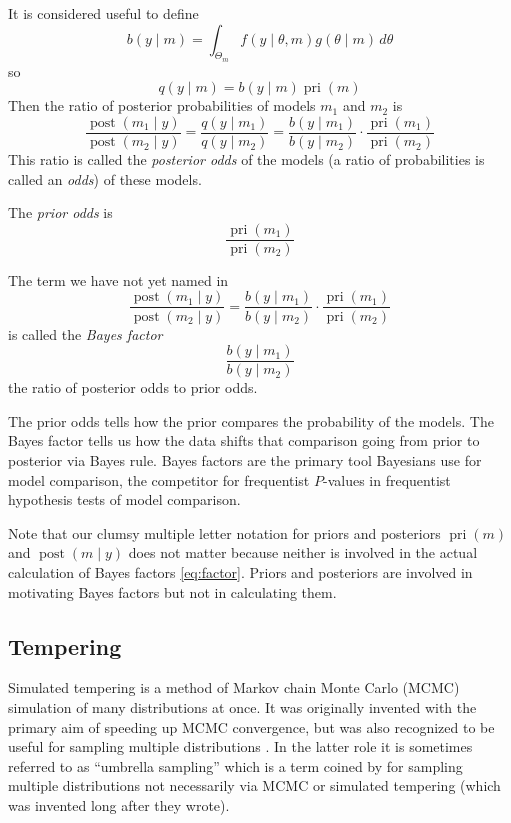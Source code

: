 \documentclass[11pt]{article}
\DeclareMathOperator{\prior}{pri}
\DeclareMathOperator{\posterior}{post}
\begin{document}
It is considered useful to define
$$
   b(y \mid m)
   =
   \int_{\Theta_m} f(y \mid \theta, m) g(\theta \mid m) \, d \theta
$$
so
$$
   q(y \mid m) = b(y \mid m) \prior(m)
$$
Then the ratio of posterior probabilities of models $m_1$ and $m_2$ is
$$
   \frac{\posterior(m_1 \mid y)}{\posterior(m_2 \mid y)}
   =
   \frac{q(y \mid m_1)}{q(y \mid m_2)}
   =
   \frac{b(y \mid m_1)}{b(y \mid m_2)}
   \cdot
   \frac{\prior(m_1)}{\prior(m_2)}
$$
This ratio is called the \emph{posterior odds} of the models (a ratio of
probabilities is called an \emph{odds}) of these models.

The \emph{prior odds} is
$$
   \frac{\prior(m_1)}{\prior(m_2)}
$$

The term we have not yet named in
$$
   \frac{\posterior(m_1 \mid y)}{\posterior(m_2 \mid y)}
   =
   \frac{b(y \mid m_1)}{b(y \mid m_2)}
   \cdot
   \frac{\prior(m_1)}{\prior(m_2)}
$$
is called the \emph{Bayes factor}
\begin{equation} \label{eq:factor}
   \frac{b(y \mid m_1)}{b(y \mid m_2)}
\end{equation}
the ratio of posterior odds to prior odds.

The prior odds tells how the prior compares the probability of the models.
The Bayes factor tells us how the data shifts that comparison going from
prior to posterior via Bayes rule.
Bayes factors are the primary tool Bayesians use for model comparison,
the competitor for frequentist $P$-values in frequentist hypothesis
tests of model comparison.

Note that our clumsy multiple letter notation for priors and posteriors
$\prior(m)$ and $\posterior(m \mid y)$ does not matter because neither
is involved in the actual calculation of Bayes factors \eqref{eq:factor}.
Priors and posteriors are involved in motivating Bayes factors but not in
calculating them.

\subsection{Tempering} \label{sec:temper}

Simulated tempering \citep{marinari-parisi,geyer-thompson} is a method of
Markov chain Monte Carlo (MCMC) simulation of many distributions at once.
It was originally invented with the primary aim of speeding up MCMC
convergence, but was also recognized to be useful for sampling multiple
distributions \citep{geyer-thompson}.  In the latter role it is sometimes
referred to as ``umbrella sampling'' which is a term coined
by \citet{torrie-valleau} for sampling multiple distributions not necessarily
via MCMC or simulated tempering (which was invented long after they wrote).
\end{document}
